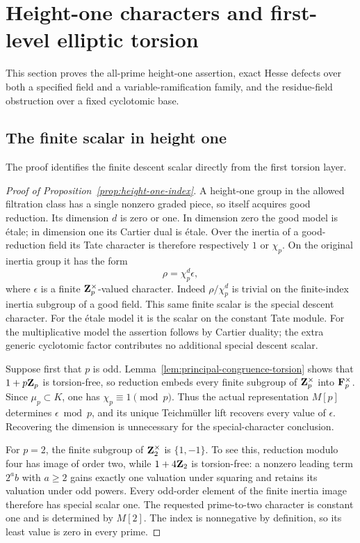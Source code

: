 \section{Height-one characters and first-level elliptic torsion}\label{sec:first-level-refinements}
This section proves the all-prime height-one assertion, exact Hesse defects over both a specified field and a variable-ramification family, and the residue-field obstruction over a fixed cyclotomic base.

\subsection{The finite scalar in height one}
The proof identifies the finite descent scalar directly from the first torsion layer.

\begin{proof}[Proof of Proposition~\ref{prop:height-one-index}]
A height-one group in the allowed filtration class has a single nonzero graded piece, so itself acquires good reduction. Its dimension $d$ is zero or one. In dimension zero the good model is \'etale; in dimension one its Cartier dual is \'etale. Over the inertia of a good-reduction field its Tate character is therefore respectively $1$ or $\chi_p$. On the original inertia group it has the form
\[
                         \rho=\chi_p^d\epsilon,
\]
where $\epsilon$ is a finite $\mathbf Z_p^\times$-valued character. Indeed $\rho/\chi_p^d$ is trivial on the finite-index inertia subgroup of a good field. This same finite scalar is the special descent character. For the \'etale model it is the scalar on the constant Tate module. For the multiplicative model the assertion follows by Cartier duality; the extra generic cyclotomic factor contributes no additional special descent scalar.

Suppose first that $p$ is odd. Lemma~\ref{lem:principal-congruence-torsion} shows that $1+p\mathbf Z_p$ is torsion-free, so reduction embeds every finite subgroup of $\mathbf Z_p^\times$ into $\mathbf F_p^\times$. Since $\mu_p\subset K$, one has $\chi_p\equiv1\pmod p$. Thus the actual representation $M[p]$ determines $\epsilon\bmod p$, and its unique Teichm\"uller lift recovers every value of $\epsilon$. Recovering the dimension is unnecessary for the special-character conclusion.

For $p=2$, the finite subgroup of $\mathbf Z_2^\times$ is $\{1,-1\}$. To see this, reduction modulo four has image of order two, while $1+4\mathbf Z_2$ is torsion-free: a nonzero leading term $2^a b$ with $a\ge2$ gains exactly one valuation under squaring and retains its valuation under odd powers. Every odd-order element of the finite inertia image therefore has special scalar one. The requested prime-to-two character is constant one and is determined by $M[2]$. The index is nonnegative by definition, so its least value is zero in every prime.
\end{proof}

